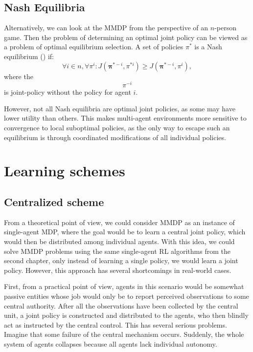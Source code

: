\subsection{Nash Equilibria}
Alternatively, we can look at the MMDP from the perspective of an $n$-person game. 
Then the problem of determining an optimal joint policy can be viewed as a problem of optimal equilibrium selection.
A set of policies $\pi^*$ is a Nash equilibrium (\cite{NASH}) if:
\[
    \forall i \in n, \forall \pi^i: J(\boldsymbol{\pi}^{*-i}, \pi^{*i}) \ge J(\boldsymbol{\pi}^{*-i}, \pi^i),
\]
where the
\[{\pi}^{-i}
\] is joint-policy without the policy for agent $i$.

However, not all Nash equilibria are optimal joint policies, as some may have lower utility than others.
This makes multi-agent environments more sensitive to convergence to local suboptimal policies, as the only way to escape such an equilibrium is through coordinated modifications of all individual policies.



\section{Learning schemes}
\subsection*{Centralized scheme}\label{CentralScheme}
From a theoretical point of view, we could consider MMDP as an instance of single-agent MDP, where the goal would be to learn a central joint policy, which would then be distributed among individual agents.
With this idea, we could solve MMDP problems using the same single-agent RL algorithms from the second chapter, only instead of learning a single policy, we would learn a joint policy.
However, this approach has several shortcomings in real-world cases.

First, from a practical point of view, agents in this scenario would be somewhat passive entities whose job would only be to report perceived observations to some central authority.
After all the observations have been collected by the central unit, a joint policy is constructed and distributed to the agents, who then blindly act as instructed by the central control.
This has several serious problems.
Imagine that some failure of the central mechanism occurs.
Suddenly, the whole system of agents collapses because all agents lack individual autonomy.

